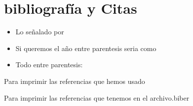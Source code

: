 \section{bibliografía y Citas}

\begin{itemize}
    \item Lo señalado por \cite{negusLinuxBible2015}
    \item Si queremos el año entre parentesis seria como \citet{negusLinuxBible2015}
    \item Todo entre parentesis: \citep{negusLinuxBible2015}
\end{itemize}

Para imprimir las referencias que hemos usado 

\printbibliography

Para imprimir las referencias que tenemos en el archivo.biber

\nocite{*}